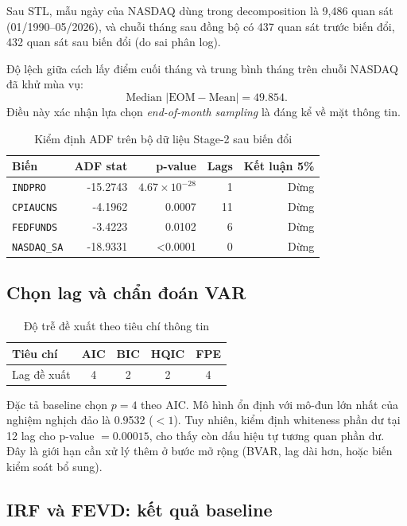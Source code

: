 \documentclass[12pt,a4paper]{article}
\begin{document}
Sau STL, mẫu ngày của NASDAQ dùng trong decomposition là 9,486 quan sát (01/1990--05/2026), và chuỗi tháng sau đồng bộ có 437 quan sát trước biến đổi, 432 quan sát sau biến đổi (do sai phân log).

Độ lệch giữa cách lấy điểm cuối tháng và trung bình tháng trên chuỗi NASDAQ đã khử mùa vụ:
\[
\text{Median }| \text{EOM} - \text{Mean} | = 49.854.
\]
Điều này xác nhận lựa chọn \textit{end-of-month sampling} là đáng kể về mặt thông tin.

\begin{table}[H]
\centering
\caption{Kiểm định ADF trên bộ dữ liệu Stage-2 sau biến đổi}
\label{tab:adf}
\begin{tabular}{lrrrr}
\toprule
Biến & ADF stat & p-value & Lags & Kết luận 5\% \\
\midrule
\texttt{INDPRO} & -15.2743 & $4.67\times10^{-28}$ & 1 & Dừng \\
\texttt{CPIAUCNS} & -4.1962 & 0.0007 & 11 & Dừng \\
\texttt{FEDFUNDS} & -3.4223 & 0.0102 & 6 & Dừng \\
\texttt{NASDAQ\_SA} & -18.9331 & \textless 0.0001 & 0 & Dừng \\
\bottomrule
\end{tabular}
\end{table}

\subsection{Chọn lag và chẩn đoán VAR}

\begin{table}[H]
\centering
\caption{Độ trễ đề xuất theo tiêu chí thông tin}
\label{tab:lag}
\begin{tabular}{lcccc}
\toprule
Tiêu chí & AIC & BIC & HQIC & FPE \\
\midrule
Lag đề xuất & 4 & 2 & 2 & 4 \\
\bottomrule
\end{tabular}
\end{table}

Đặc tả baseline chọn \(p=4\) theo AIC. Mô hình ổn định với mô-đun lớn nhất của nghiệm nghịch đảo là 0.9532 (\(<1\)). Tuy nhiên, kiểm định whiteness phần dư tại 12 lag cho p-value \(=0.00015\), cho thấy còn dấu hiệu tự tương quan phần dư. Đây là giới hạn cần xử lý thêm ở bước mở rộng (BVAR, lag dài hơn, hoặc biến kiểm soát bổ sung).

\subsection{IRF và FEVD: kết quả baseline}
\end{document}
